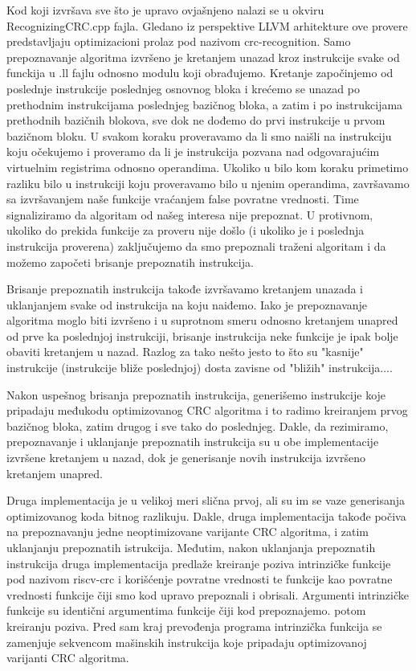 \documentclass[12pt,oneside]{memoir}
\begin{document}
Kod koji izvršava sve što je upravo ovjašnjeno nalazi se u okviru 
RecognizingCRC.cpp fajla. Gledano iz perspektive LLVM arhitekture ove provere 
predstavljaju optimizacioni prolaz pod nazivom crc-recognition. Samo 
prepoznavanje algoritma izvršeno je kretanjem unazad kroz instrukcije svake od 
funckija u .ll fajlu odnosno modulu koji obrađujemo. Kretanje započinjemo od 
poslednje instrukcije poslednjeg osnovnog bloka i krećemo se unazad po 
prethodnim instrukcijama poslednjeg bazičnog bloka, a zatim i po instrukcijama 
prethodnih bazičnih blokova, sve dok ne dođemo do prvi instrukcije u prvom 
bazičnom bloku. U svakom koraku proveravamo da li smo naišli na instrukciju 
koju očekujemo i proveramo da li je instrukcija pozvana nad odgovarajućim 
virtuelnim registrima odnosno operandima. Ukoliko u bilo kom koraku primetimo 
razliku bilo u instrukciji koju proveravamo bilo u njenim operandima, 
završavamo sa izvršavanjem naše funkcije vraćanjem false povratne vrednosti. 
Time signaliziramo da algoritam od našeg interesa nije prepoznat. U protivnom, 
ukoliko do prekida funkcije za proveru nije došlo (i ukoliko je i poslednja 
instrukcija proverena) zaključujemo da smo prepoznali traženi algoritam i da 
možemo započeti brisanje prepoznatih instrukcija. 

Brisanje prepoznatih instrukcija takođe izvršavamo kretanjem unazada i uklanjanjem svake od instrukcija na koju naiđemo. Iako je prepoznavanje algoritma moglo biti izvršeno i u suprotnom smeru odnosno kretanjem unapred od prve ka poslednjoj instrukciji, brisanje instrukcija neke funkcije je ipak bolje obaviti kretanjem u nazad. Razlog za tako nešto jesto to što su "kasnije" instrukcije (instrukcije bliže poslednjoj) dosta zavisne od "bližih" instrukcija....

Nakon uspešnog brisanja prepoznatih instrukcija, generišemo instrukcije koje pripadaju međukodu optimizovanog CRC algoritma i to radimo kreiranjem prvog bazičnog bloka, zatim drugog i sve tako do poslednjeg. Dakle, da rezimiramo, prepoznavanje i uklanjanje prepoznatih instrukcija su u obe implementacije izvršene kretanjem u nazad, dok je generisanje novih instrukcija izvršeno kretanjem unapred. 

Druga implementacija je u velikoj meri slična prvoj, ali su im se vaze generisanja optimizovanog koda bitnog razlikuju. Dakle, druga implementacija takođe počiva na prepoznavanju jedne neoptimizovane varijante CRC algoritma, i zatim uklanjanju prepoznatih istrukcija. 
Međutim, nakon uklanjanja prepoznatih instrukcija druga implementacija predlaže kreiranje poziva intrinzičke funkcije pod nazivom riscv-crc i korišćenje povratne vrednosti te funkcije kao povratne vrednosti funkcije čiji smo kod upravo prepoznali i obrisali. Argumenti intrinzičke funkcije su identični argumentima funkcije čiji kod prepoznajemo. 
potom kreiranju poziva. Pred sam kraj prevođenja programa 
intrinzička funkcija se zamenjuje sekvencom mašinskih instrukcija koje pripadaju optimizovanoj varijanti CRC algoritma. 
\end{document}
